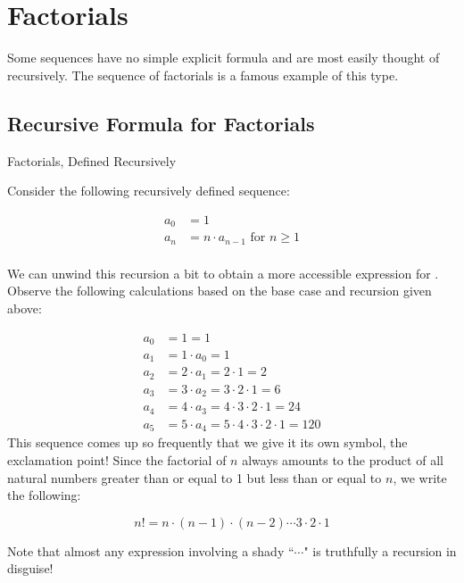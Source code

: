 \section{Factorials}

Some sequences have no simple explicit formula and are most easily thought of recursively.  The sequence of factorials is a famous example of this type.
\subsection{Recursive Formula for Factorials}
\begin{example}{Factorials, Defined Recursively}

Consider the following recursively defined sequence:

\begin{align*}
a_0 &= 1 \\
a_n &= n\cdot a_{n-1}\text{ for }n \geq 1\\ 
\end{align*} 

We can unwind this recursion a bit to obtain a more accessible expression for .  Observe the following calculations based on the base case and recursion given above:

\begin{align*}
a_0 &= 1 =1 \\
a_1 &= 1 \cdot a_0 = 1 \\
a_2 &= 2 \cdot a_1 = 2 \cdot 1=2 \\
a_3 &= 3 \cdot a_2 = 3 \cdot 2 \cdot 1=6 \\
a_4 &= 4 \cdot a_3 = 4 \cdot 3 \cdot 2 \cdot 1=24 \\
a_5 &= 5 \cdot a_4 = 5 \cdot 4 \cdot 3 \cdot 2 \cdot 1 = 120
\end{align*}
This sequence comes up so frequently that we give it its own symbol, the exclamation point!  Since the factorial of $n$ always amounts to the product of all natural numbers greater than or equal to 1 but less than or equal to $n$, we write the following:

$$ n! = n\cdot (n-1) \cdot (n-2) \cdots 3 \cdot 2 \cdot 1 $$

\end{example} 

Note that almost any expression involving a shady ``$\cdots$" is truthfully a recursion in disguise! 


